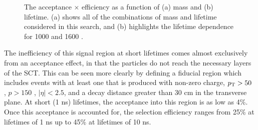 \begin{figure}
\centering
{}
\caption{The acceptance $\times$ efficiency as a function of \rhadron (a) mass and (b) lifetime. (a) shows all of the combinations of mass and lifetime considered in this search, and (b) highlights the lifetime dependence for 1000 \GeV and 1600 \GeV \rhadrons.}
\label{fig:efficiency}
\end{figure}

The inefficiency of this signal region at short lifetimes comes almost exclusively from an acceptance effect, in that the particles do not reach the necessary layers of the SCT.
This can be seen more clearly by defining a fiducial region which includes events with at least one \rhadron that is produced with non-zero charge, $p_{\mathrm{T}} > 50$ \GeV, $p > 150$ \GeV, $|\eta| < 2.5$, and a decay distance greater than 30 cm in the transverse plane.
At short (1 ns) lifetimes, the acceptance into this region is as low as 4\%. 
Once this acceptance is accounted for, the selection efficiency ranges from 25\% at lifetimes of 1 ns up to 45\% at lifetimes of 10 ns. 

